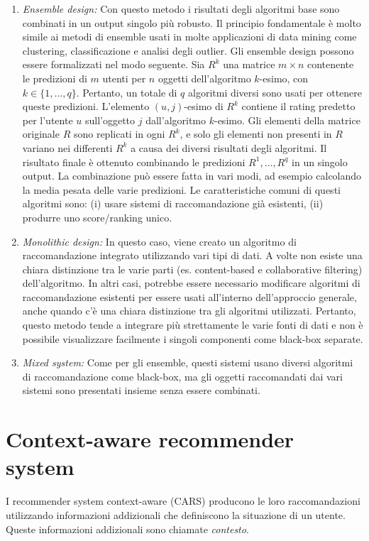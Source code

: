 \begin{enumerate}
 \item \textit{Ensemble design:} Con questo metodo i risultati degli algoritmi base sono combinati in un output singolo più robusto. Il principio fondamentale è molto simile ai metodi di ensemble usati in molte applicazioni di data mining come clustering, classificazione e analisi degli outlier. 
Gli ensemble design possono essere formalizzati nel modo seguente. Sia $R^k$ una matrice $m \times n$ contenente le predizioni di $m$ utenti per $n$ oggetti dell'algoritmo $k$-esimo, con $k \in \{1, \dots ,q\}$. Pertanto, un totale di $q$ algoritmi diversi sono usati per ottenere queste predizioni. L'elemento $(u,j)$-esimo di $R^k$ contiene il rating predetto per l'utente $u$ sull'oggetto $j$ dall'algoritmo $k$-esimo. Gli elementi della matrice originale $R$ sono replicati in ogni $R^k$, e solo gli elementi non presenti in $R$ variano nei differenti $R^k$ a causa dei diversi risultati degli algoritmi. Il risultato finale è ottenuto combinando le predizioni $R^1, \dots, R^q$ in un singolo output. La combinazione può essere fatta in vari modi, ad esempio calcolando la media pesata delle varie predizioni. Le caratteristiche comuni di questi algoritmi sono: (i) usare sistemi di raccomandazione già esistenti, (ii) produrre uno score/ranking unico.
 \item \textit{Monolithic design:} In questo caso, viene creato un algoritmo di raccomandazione integrato utilizzando vari tipi di dati. A volte non esiste una chiara distinzione tra le varie parti (es. content-based e collaborative filtering) dell'algoritmo. In altri casi, potrebbe essere necessario modificare algoritmi di raccomandazione esistenti per essere usati all'interno dell'approccio generale, anche quando c'è una chiara distinzione tra gli algoritmi utilizzati.  Pertanto, questo metodo tende a integrare più strettamente le varie fonti di dati e non è possibile visualizzare facilmente i singoli componenti come black-box separate.
 \item \textit{Mixed system:}  Come per gli ensemble, questi sistemi usano diversi algoritmi di raccomandazione come black-box, ma gli oggetti raccomandati dai vari sistemi sono presentati insieme senza essere combinati.
\end{enumerate} 

\section{Context-aware recommender system}
I recommender system context-aware (CARS) producono le loro raccomandazioni utilizzando informazioni addizionali che definiscono la situazione di un utente. Queste informazioni addizionali sono chiamate \textit{contesto}.

